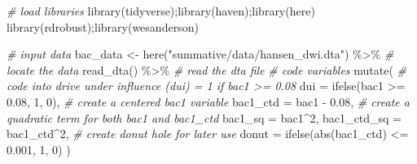 \documentclass[
  11pt,
]{article}
\newenvironment{Shaded}{\begin{snugshade}}{\end{snugshade}}
\newcommand{\AttributeTok}[1]{\textcolor[rgb]{0.77,0.63,0.00}{#1}}
\newcommand{\CommentTok}[1]{\textcolor[rgb]{0.56,0.35,0.01}{\textit{#1}}}
\newcommand{\DecValTok}[1]{\textcolor[rgb]{0.00,0.00,0.81}{#1}}
\newcommand{\FloatTok}[1]{\textcolor[rgb]{0.00,0.00,0.81}{#1}}
\newcommand{\FunctionTok}[1]{\textcolor[rgb]{0.00,0.00,0.00}{#1}}
\newcommand{\NormalTok}[1]{#1}
\newcommand{\OtherTok}[1]{\textcolor[rgb]{0.56,0.35,0.01}{#1}}
\newcommand{\SpecialCharTok}[1]{\textcolor[rgb]{0.00,0.00,0.00}{#1}}
\newcommand{\StringTok}[1]{\textcolor[rgb]{0.31,0.60,0.02}{#1}}
\begin{document}
\begin{Shaded}
\begin{Highlighting}[]
\CommentTok{\# load libraries}
\FunctionTok{library}\NormalTok{(tidyverse);}\FunctionTok{library}\NormalTok{(haven);}\FunctionTok{library}\NormalTok{(here)}
\FunctionTok{library}\NormalTok{(rdrobust);}\FunctionTok{library}\NormalTok{(wesanderson)}

\CommentTok{\# input data}
\NormalTok{bac\_data }\OtherTok{\textless{}{-}} 
  \FunctionTok{here}\NormalTok{(}\StringTok{"summative/data/hansen\_dwi.dta"}\NormalTok{) }\SpecialCharTok{\%\textgreater{}\%} \CommentTok{\# locate the data}
  \FunctionTok{read\_dta}\NormalTok{() }\SpecialCharTok{\%\textgreater{}\%} \CommentTok{\# read the dta file}
  \CommentTok{\# code variables}
  \FunctionTok{mutate}\NormalTok{(}
    \CommentTok{\# code into drive under influence (dui) = 1 if bac1 \textgreater{}= 0.08}
    \AttributeTok{dui =} \FunctionTok{ifelse}\NormalTok{(bac1 }\SpecialCharTok{\textgreater{}=} \FloatTok{0.08}\NormalTok{, }\DecValTok{1}\NormalTok{, }\DecValTok{0}\NormalTok{), }
    \CommentTok{\# create a centered bac1 variable}
    \AttributeTok{bac1\_ctd =}\NormalTok{ bac1 }\SpecialCharTok{{-}} \FloatTok{0.08}\NormalTok{,}
    \CommentTok{\# create a quadratic term for both bac1 and bac1\_ctd}
    \AttributeTok{bac1\_sq =}\NormalTok{ bac1}\SpecialCharTok{\^{}}\DecValTok{2}\NormalTok{,}
    \AttributeTok{bac1\_ctd\_sq =}\NormalTok{ bac1\_ctd}\SpecialCharTok{\^{}}\DecValTok{2}\NormalTok{,}
    \CommentTok{\# create donut hole for later use}
    \AttributeTok{donut =} \FunctionTok{ifelse}\NormalTok{(}\FunctionTok{abs}\NormalTok{(bac1\_ctd) }\SpecialCharTok{\textless{}=} \FloatTok{0.001}\NormalTok{, }\DecValTok{1}\NormalTok{, }\DecValTok{0}\NormalTok{)}
\NormalTok{    )}


\end{Highlighting}
\end{Shaded}
\end{document}
